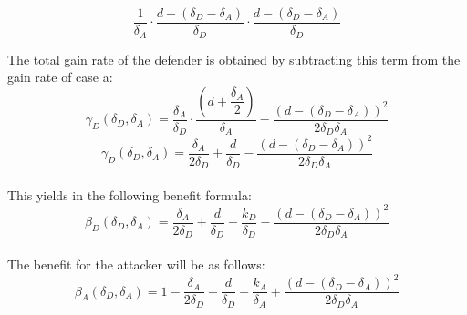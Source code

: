 \begin{equation*}
\dfrac{1} {\delta_{A}} \cdot \dfrac{d - (\delta_{D} - \delta_{A})}{\delta_{D}} \cdot \dfrac{d - (\delta_{D} - \delta_{A})}{\delta_{D}}
\end{equation*}

The total gain  rate of the defender is obtained by subtracting this term from the gain rate of case a:
 \begin{equation*}
\gamma_{D}(\delta_{D},\delta_{A}) = \dfrac{\delta_{A}}{\delta_{D}} \cdot \dfrac{(d+\dfrac{\delta_{A}}{2})}{\delta_{A}} - \dfrac{(d - (\delta_{D} - \delta_{A}))^{2}}{2 \delta_{D} \delta_{A}}
\end{equation*}
\begin{equation*}
\gamma_{D}(\delta_{D},\delta_{A}) = \dfrac{\delta_{A}}{2\delta_{D}} + \dfrac{d}{\delta_{D}} - \dfrac{(d - (\delta_{D} - \delta_{A}))^{2}}{2 \delta_{D} \delta_{A}}
\end{equation*}\\
This yields in the following benefit formula:
\begin{equation*}
\beta_{D}(\delta_{D},\delta_{A}) = \dfrac{\delta_{A}}{2\delta_{D}} + \dfrac{d}{\delta_{D}} - \dfrac{k_{D} }{\delta_{D}} - \dfrac{(d - (\delta_{D} - \delta_{A}))^{2}}{2 \delta_{D} \delta_{A}}
\end{equation*}\\
 
The benefit for the attacker will be as follows:
\begin{equation*}
\beta_{A}(\delta_{D},\delta_{A}) = 1 -\dfrac{\delta_{A}}{2\delta_{D}} - \dfrac{d}{\delta_{D}} - \dfrac{k_{A}}{ \delta_{A}} + \dfrac{(d - (\delta_{D} - \delta_{A}))^{2}}{2 \delta_{D} \delta_{A}}
\end{equation*}\\


